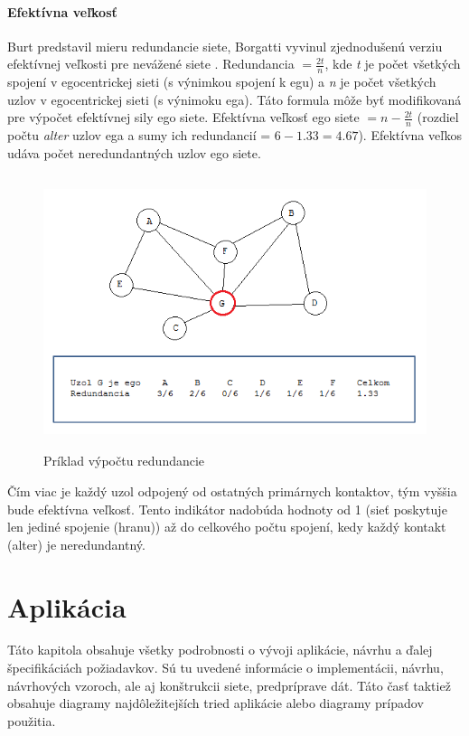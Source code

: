 \documentclass[slovak,master,public,dept460,male,cpdeclaration,oneside]{diploma}
\begin{document}
\paragraph{Efektívna veľkosť} 
\hfill \break
Burt predstavil mieru redundancie siete, Borgatti vyvinul zjednodušenú verziu efektívnej veľkosti pre nevážené siete \cite{borgatti1997structural}. Redundancia ${ = \frac{2t}{n}}$, kde \textit{t} je počet všetkých spojení v egocentrickej sieti (s výnimkou spojení k egu) a \textit{n} je počet všetkých uzlov v egocentrickej sieti (s výnimoku ega). Táto formula môže byť modifikovaná pre výpočet efektívnej sily ego siete. Efektívna veľkosť ego siete ${ = n - \frac{2t}{n}}$ (rozdiel počtu \textit{alter} uzlov ega a sumy ich redundancií = ${6-1.33 = 4.67}$). Efektívna veľkos udáva počet neredundantných uzlov ego siete.


\begin{figure}[H]
\centering
\includegraphics[width=14cm, height=8cm]{figures/efectivesize}
\caption{Príklad výpočtu redundancie}
\end{figure}

Čím viac je každý uzol odpojený od ostatných primárnych kontaktov, tým vyššia bude efektívna veľkosť. Tento indikátor nadobúda hodnoty od 1 (sieť poskytuje len jediné spojenie (hranu)) až do celkového počtu spojení, kedy každý kontakt (alter) je neredundantný.

\section{Aplikácia}
Táto kapitola obsahuje všetky podrobnosti o vývoji aplikácie, návrhu a ďalej špecifikáciách požiadavkov. Sú tu uvedené informácie o implementácii, návrhu, návrhových vzoroch, ale aj  konštrukcii siete, predpríprave dát. Táto časť taktiež obsahuje diagramy najdôležitejších tried aplikácie alebo diagramy prípadov použitia. 
\end{document}
